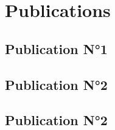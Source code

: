 \part{Publications}
\chapter{Publication N°1}
 
\cleardoublepage
\chapter{Publication N°2}
 
\cleardoublepage
\chapter{Publication N°2}
 